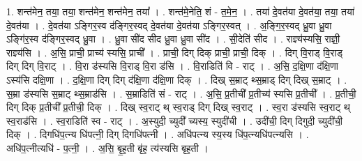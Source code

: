 \documentclass[17pt]{extarticle}
\begin{document}
1. शन्त॑मेन॒ तया॒ तया॒ शन्त॑मेन॒ शन्त॑मेन॒ तया᳚ । . शन्त॑मे॒नेति॒ शं - त॒मे॒न॒ । . तया॑ दे॒वत॑या दे॒वत॑या॒ तया॒ तया॑ दे॒वत॑या । . दे॒वत॑या ऽङ्गिर॒स्व द॑ङ्गिर॒स्वद् दे॒वत॑या दे॒वत॑या ऽङ्गिर॒स्वत् । . अ॒ङ्गि॒र॒स्वद् ध्रु॒वा ध्रु॒वा ऽङ्गि॑र॒स्व द॑ङ्गिर॒स्वद् ध्रु॒वा । . ध्रु॒वा सी॑द सीद ध्रु॒वा ध्रु॒वा सी॑द । . सी॒देति॑ सीद । . राज्ञ्य॑स्यसि॒ राज्ञी॒ राज्ञ्य॑सि । . अ॒सि॒ प्राची॒ प्राच्य॑ स्यसि॒ प्राची᳚ । . प्राची॒ दिग् दिक् प्राची॒ प्राची॒ दिक् । . दिग् वि॒राड् वि॒राड् दिग् दिग् वि॒राट् । . वि॒रा ड॑स्यसि वि॒राड् वि॒रा ड॑सि । . वि॒राडिति॑ वि - राट् । . अ॒सि॒ द॒क्षि॒णा द॑क्षि॒णा ऽस्य॑सि दक्षि॒णा । . द॒क्षि॒णा दिग् दिग् द॑क्षि॒णा द॑क्षि॒णा दिक् । . दिख् स॒म्राट् थ्स॒म्राड् दिग् दिख् स॒म्राट् । . स॒म्रा ड॑स्यसि स॒म्राट् थ्स॒म्राड॑सि । . स॒म्राडिति॑ सं - राट् । . अ॒सि॒ प्र॒तीची᳚ प्र॒तीच्य॑ स्यसि प्र॒तीची᳚ । . प्र॒तीची॒ दिग् दिक् प्र॒तीची᳚ प्र॒तीची॒ दिक् । . दिख् स्व॒राट् थ् स्व॒राड् दिग् दिख् स्व॒राट् । . स्व॒रा ड॑स्यसि स्व॒राट् थ् स्व॒राड॑सि । . स्व॒राडिति॑ स्व - राट् । . अ॒स्युदी॒ च्युदी᳚ च्यस्य॒ स्युदी॑ची । . उदी॑ची॒ दिग् दिगुदी॒ च्युदी॑ची॒ दिक् । . दिगधि॑प॒त्न्य धि॑पत्नी॒ दिग् दिगधि॑पत्नी । . अधि॑पत्न्य स्य॒स्य धि॑प॒त्न्यधि॑पत्न्यसि । . अधि॑प॒त्नीत्यधि॑ - प॒त्नी॒ । . अ॒सि॒ बृ॒ह॒ती बृ॑ह॒ त्य॑स्यसि बृह॒ती । \newline
\end{document}
